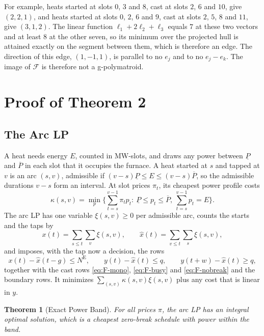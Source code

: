 \documentclass[11pt]{article}
\newtheorem{theorem}{Theorem}
\newcommand{\NE}{N^{\mathrm{E}}}
\newcommand{\calF}{\mathcal{F}}
\begin{document}
For example, heats started at slots $0$, $3$ and $8$, cast at slots $2$, $6$ and $10$, give $(2,2,1)$, and heats started
at slots $0$, $2$, $6$ and $9$, cast at slots $2$, $5$, $8$ and $11$, give $(3,1,2)$. The linear function
$\ell_1+2\ell_2+\ell_3$ equals $7$ at these two vectors and at least $8$ at the other seven, so its minimum over the
projected hull is attained exactly on the segment between them, which is therefore an edge. The direction of this edge,
$(1,-1,1)$, is parallel to no $e_j$ and to no $e_j-e_k$. The image of $\calF$ is therefore not a g-polymatroid.

\section{Proof of Theorem 2}\label{sec:thm2}

\subsection{The Arc LP}

A heat needs energy $E$, counted in MW-slots, and draws any power between $\underline P$ and $\overline P$ in each slot
that it occupies the furnace. A heat started at $s$ and tapped at $v$ is an arc $(s,v)$, admissible if
$(v-s)\underline P\le E\le(v-s)\overline P$, so the admissible durations $v-s$ form an interval. At slot prices $\pi_t$,
its cheapest power profile costs
\begin{equation}\label{eq:kappa}
\kappa(s,v)=\min_p\Big\{\sum_{t=s}^{v-1}\pi_tp_t:\ \underline P\le p_t\le\overline P,\ \sum_{t=s}^{v-1}p_t=E\Big\}.
\end{equation}
The arc LP has one variable $\xi(s,v)\ge0$ per admissible arc, counts the starts and the taps by
\begin{equation}\label{eq:arc}
x(t)=\sum_{s\le t}\sum_v\xi(s,v),\qquad \hat x(t)=\sum_{v\le t}\sum_s\xi(s,v),
\end{equation}
and imposes, with the tap now a decision, the rows
\begin{equation}\label{eq:arcrows}
x(t)-\hat x(t-g)\le\NE,\qquad y(t)-\hat x(t)\le q,\qquad y(t+w)-\hat x(t)\ge q,
\end{equation}
together with the cast rows \eqref{eq:F-mono}, \eqref{eq:F-busy} and \eqref{eq:F-nobreak} and the boundary rows. It
minimizes $\sum_{(s,v)}\kappa(s,v)\xi(s,v)$ plus any cost that is linear in $y$.

\begin{theorem}[Exact Power Band]
For all prices $\pi$, the arc LP has an integral optimal solution, which is a cheapest zero-break schedule with power
within the band.
\end{theorem}
\end{document}
